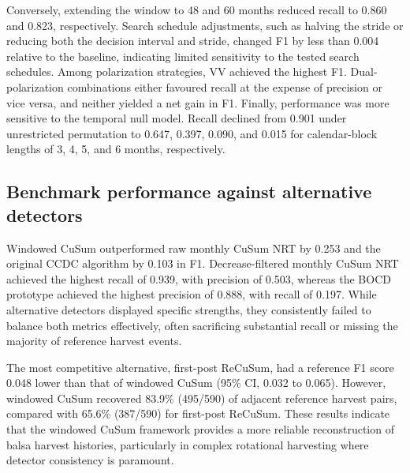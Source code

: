 Conversely, extending the window to 48 and 60 months reduced recall to 0.860 and 0.823, respectively. Search schedule adjustments, such as halving the stride or reducing both the decision interval and stride, changed F1 by less than 0.004 relative to the baseline, indicating limited sensitivity to the tested search schedules. Among polarization strategies, VV achieved the highest F1. Dual-polarization combinations either favoured recall at the expense of precision or vice versa, and neither yielded a net gain in F1. Finally, performance was more sensitive to the temporal null model. Recall declined from 0.901 under unrestricted permutation to 0.647, 0.397, 0.090, and 0.015 for calendar-block lengths of 3, 4, 5, and 6 months, respectively.

\subsection{Benchmark performance against alternative detectors}
\label{sec:benchmark_null_sensitivity}

Windowed CuSum outperformed raw monthly CuSum NRT by 0.253 and the original CCDC algorithm by 0.103 in F1. Decrease-filtered monthly CuSum NRT achieved the highest recall of 0.939, with precision of 0.503, whereas the BOCD prototype achieved the highest precision of 0.888, with recall of 0.197. While alternative detectors displayed specific strengths, they consistently failed to balance both metrics effectively, often sacrificing substantial recall or missing the majority of reference harvest events.

The most competitive alternative, first-post ReCuSum, had a reference F1 score 0.048 lower than that of windowed CuSum (95\% CI, 0.032 to 0.065). However, windowed CuSum recovered 83.9\% (495/590) of adjacent reference harvest pairs, compared with 65.6\% (387/590) for first-post ReCuSum. These results indicate that the windowed CuSum framework provides a more reliable reconstruction of balsa harvest histories, particularly in complex rotational harvesting where detector consistency is paramount.

